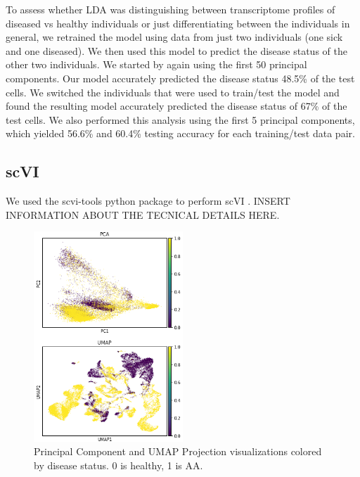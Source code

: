 \documentclass{article}
\begin{document}
To assess whether LDA was distinguishing between transcriptome profiles of diseased vs healthy individuals or just differentiating between the individuals in general, we retrained the model using data from just two individuals (one sick and one diseased).
We then used this model to predict the disease status of the other two individuals.
We started by again using the first 50 principal components.
Our model accurately predicted the disease status 48.5\% of the test cells.
We switched the individuals that were used to train/test the model and found the resulting model accurately predicted the disease status of 67\% of the test cells.
We also performed this analysis using the first 5 principal components, which yielded 56.6\% and 60.4\% testing accuracy for each training/test data pair.

\subsection{scVI}
We used the scvi-tools python package to perform scVI \citep{lopez_deep_2018, gayoso_python_2022}.
INSERT INFORMATION ABOUT THE TECNICAL DETAILS HERE.


\begin{figure}
  \centering
  \includegraphics[width=0.5\textwidth]{disease_status.png}
  \caption{Principal Component and UMAP Projection visualizations colored by disease status. 0 is healthy, 1 is AA.}
  \label{PCA_projections_disease}
\end{figure}
\end{document}
